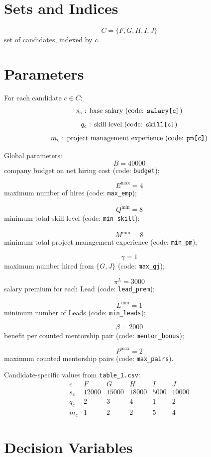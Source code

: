 \section*{Sets and Indices}

\[
C=\{F,G,H,I,J\}
\]
set of candidates, indexed by \(c\).

\section*{Parameters}

For each candidate \(c \in C\):
\[
s_c \text{ : base salary (code: \texttt{salary[c]})}
\]
\[
q_c \text{ : skill level (code: \texttt{skill[c]})}
\]
\[
m_c \text{ : project management experience (code: \texttt{pm[c]})}
\]

Global parameters:
\[
B = 40000
\]
company budget on net hiring cost (code: \texttt{budget});

\[
E^{\max} = 4
\]
maximum number of hires (code: \texttt{max\_emp});

\[
Q^{\min} = 8
\]
minimum total skill level (code: \texttt{min\_skill});

\[
M^{\min} = 8
\]
minimum total project management experience (code: \texttt{min\_pm});

\[
\gamma = 1
\]
maximum number hired from \(\{G,J\}\) (code: \texttt{max\_gj});

\[
\pi^{L} = 3000
\]
salary premium for each Lead (code: \texttt{lead\_prem});

\[
L^{\min} = 1
\]
minimum number of Leads (code: \texttt{min\_leads});

\[
\beta = 2000
\]
benefit per counted mentorship pair (code: \texttt{mentor\_bonus});

\[
P^{\max} = 2
\]
maximum counted mentorship pairs (code: \texttt{max\_pairs}).

Candidate-specific values from \texttt{table\_1.csv}:
\[
\begin{array}{c|ccccc}
c & F & G & H & I & J\\ \hline
s_c & 12000 & 15000 & 18000 & 5000 & 10000\\
q_c & 2 & 3 & 4 & 1 & 2\\
m_c & 1 & 2 & 2 & 5 & 4
\end{array}
\]

\section*{Decision Variables}

